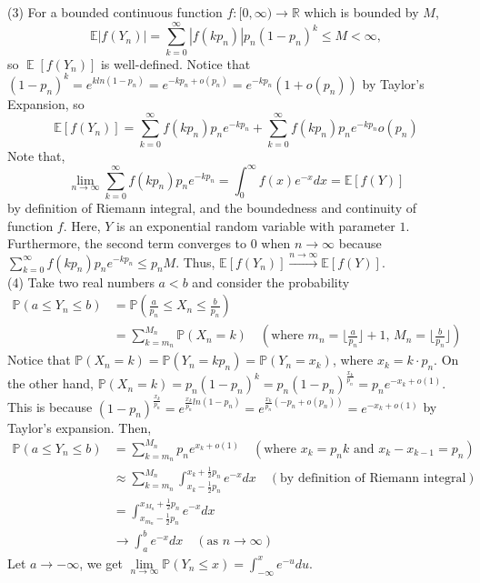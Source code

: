 \documentclass[12pt]{article}
\DeclareMathOperator{\ex}{\mathbb{E}}
\begin{document}
(3) For a bounded continuous function $f:[0,\infty)\rightarrow\mathbb{R}$ which is bounded by $M$, $$\mathbb{E}|f(Y_{n})|=\sum_{k=0}^{\infty}|f(kp_{n})|p_{n}(1-p_{n})^{k}\leqslant M < \infty,$$ so $\ex[f(Y_n)]$ is well-defined.
Notice that $(1-p_{n})^{k}=e^{kln(1-p_{n})}=e^{-kp_{n}+o(p_{n})}=e^{-kp_{n}}(1+o(p_{n}))$ by Taylor's Expansion, so $$\mathbb{E}[f(Y_{n})]=\sum_{k=0}^{\infty}f(kp_{n})p_{n}e^{-kp_{n}}+\sum_{k=0}^{\infty}f(kp_{n})p_{n}e^{-kp_{n}}o(p_{n})$$
Note that, $$\lim_{n\rightarrow\infty}\sum_{k=0}^{\infty}f(kp_{n})p_{n}e^{-kp_{n}}=\int_{0}^{\infty}f(x)e^{-x}dx=\mathbb{E}[f(Y)]$$
by definition of Riemann integral, and the boundedness and continuity of function $f$. Here, $Y$ is an exponential random variable with parameter $1$. Furthermore, the second term converges to $0$ when $n\rightarrow\infty$ because $\sum_{k=0}^{\infty}f(kp_{n})p_{n}e^{-kp_{n}}\leqslant p_{n}M$. Thus, $\mathbb{E}[f(Y_{n})]\xrightarrow{n\rightarrow\infty}\mathbb{E}[f(Y)]$.\\
(4) Take two real numbers $a<b$ and consider the probability
\begin{align*}
	\mathbb{P}(a\leqslant Y_{n}\leqslant b) &= \mathbb{P}(\frac{a}{p_{n}}\leqslant X_{n}\leqslant \frac{b}{p_{n}})\\
	&=\sum_{k=m_{n}}^{M_{n}}\mathbb{P}(X_{n}=k)\quad(\text{where $m_n=\lfloor\frac{a}{p_{n}}\rfloor +1$, $M_{n}=\lfloor\frac{b}{p_{n}}\rfloor$})
	\end{align*}
Notice that $\mathbb{P}(X_{n}=k)=\mathbb{P}(Y_{n}=kp_{n})= \mathbb{P}(Y_{n}=x_{k})$, where $x_{k}=k\cdot p_{n}$. On the other hand, $\mathbb{P}(X_{n}=k)=p_{n}(1-p_{n})^{k} = p_{n}(1-p_{n})^{\frac{x_{k}}{p_{n}}} = p_{n} e^{-x_{k}+o(1)}$. This is because $(1-p_{n})^{\frac{x_{k}}{p_{n}}}=e^{\frac{x_{k}}{p_{n}}ln(1-p_{n})}=e^{\frac{x_{k}}{p_{n}}(-p_{n}+o(p_{n}))}=e^{-x_{k}+o(1)}$ by Taylor's expansion. Then,
\begin{align*}
	\mathbb{P}(a\leqslant Y_{n}\leqslant b) &= \sum_{k=m_{n}}^{M_{n}}p_{n}e^{x_{k}+o(1)}\quad(\text{where $x_{k}=p_{n}k$ and $x_{k}-x_{k-1}=p_{n}$})\\
	&\approx\sum_{k=m_{n}}^{M_{n}}\int_{x_{k}-\frac{1}{2}p_{n}}^{x_{k}+\frac{1}{2}p_{n}}e^{-x}dx\quad(\text{by definition of Riemann integral})\\
	&=\int_{x_{m_{n}}-\frac{1}{2}p_{n}}^{x_{M_{n}}+\frac{1}{2}p_{n}}e^{-x}dx\\
	& \rightarrow \int_{a}^{b}e^{-x}dx\quad(\text{as $n\rightarrow\infty$})
\end{align*}
Let $a\rightarrow -\infty$, we get $\lim\limits_{n\rightarrow\infty}\mathbb{P}(Y_{n}\leqslant x)=\int_{-\infty}^{x}e^{-u}du$.
\end{document}
